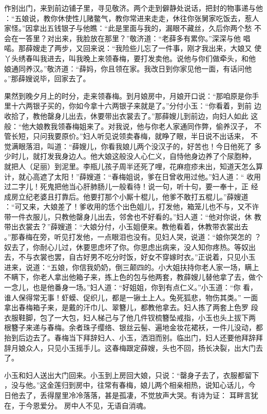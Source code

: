 作别出门，来到前边铺子里，寻见敬济。两个走到僻静处说话，把封的物事递与他
：“五娘说，教你休使性儿赌鳖气，教你常进来走走，休往你张舅家吃饭去，惹人
家怪。”因拿出五钱银子与他瞧：“此是里面与我的，漏眼不藏丝，久后你两个愁
不会在一答里？对出来，我脸放在那里？”敬济道：“老薛多有累你。”深深与他
唱喏。那薛嫂走了两步，又回来说：“我险些儿忘了一件事，刚才我出来，大娘又
使丫头绣春叫我进去，叫我晚上来领春梅，要打发卖他。说他与你们做牵头，和他
娘通同养汉。”敬济道：“薛妈，你且领在家。我改日到你家见他一面，有话问他
。”那薛嫂说毕，回家去了。

果然到晚夕月上的时分，走来领春梅。到月娘房中，月娘开口说：“那咱原是你手
里十六两银子买的，你如今拿十六两银子来就是了。”分付小玉：“你看着，到前
边收拾了，教他罄身儿出去，休要带出衣裳去了。”那薛嫂儿到前边，向妇人如此
这般：“他大娘教我领春梅姐来了。对我说，他与你老人家通同作弊，偷养汉子，
不管长短，只问我要原价。”妇人听见说领卖春梅，就睁了眼，半日说不出话来，
不觉满眼落泪，叫道：“薛嫂儿，你看我娘儿两个没汉子的，好苦也！今日他死了
多少时儿，就打发我身边人。他大娘这般没人心仁义，自恃他身边养了个尿胞种，
就把人（足丽）到泥里。李瓶儿孩子周半还死了哩，花麻痘疹未出，知道天怎么算
计，就心高遮了太阳！”薛嫂道：“春梅姐说，爹在日曾收用过他。”妇人道：“
收用过二字儿！死鬼把他当心肝肺肠儿一般看待！说一句，听十句，要一奉十，正
经成房立纪老婆且打靠后。他要打那个小厮十棍儿，他爹不敢打五棍儿。”薛嫂道
：“可又来，大娘差了！爹收用的恁个出色姐儿，打发他，箱笼儿也不与，又不许
带一件衣服儿，只教他罄身儿出去，邻舍也不好看的。”妇人道：“他对你说，休
教带出衣裳去？”薛嫂道：“大娘分付，小玉姐便来。教他看着，休教带衣裳出去
。”那春梅在旁，听见打发他，一点眼泪也没有。见妇人哭，说道：“娘你哭怎的
？奴去了，你耐心儿过，休要思虑坏了你。你思虑出病来，没人知你疼热。等奴出
去，不与衣裳也罢，自古好男不吃分时饭，好女不穿嫁时衣。”正说着，只见小玉
进来，说道：“五娘，你信我奶奶，倒三颠四的。小大姐扶持你老人家一场，瞒上
不瞒下，你老人拿出他箱子来，拣上色的包与他两套，教薛嫂儿替他拿了去，做个
一念儿，也是他番身一场。”妇人道：“好姐姐，你到有点仁义。”小玉道：“你
看，谁人保得常无事！虾蟆、促织儿，都是一锹土上人。兔死狐悲，物伤其类。”
一面拿出春梅箱子来，是戴的汗巾儿、翠簪儿，都教他拿去。妇人拣了两套上色罗
段衣服鞋脚，包了一大包，妇人梯己与了他几件钗梳簪坠戒指，小玉也头上拔下两
根簪子来递与春梅。余者珠子缨络、银丝云髻、遍地金妆花裙袄，一件儿没动，都
抬到后边去了。春梅当下拜辞妇人、小玉，洒泪而别。临出门，妇人还要他拜辞拜
辞月娘众人，只见小玉摇手儿。这春梅跟定薛嫂，头也不回，扬长决裂，出大门去
了。

小玉和妇人送出大门回来。小玉到上房回大娘，只说：“罄身子去了，衣服都留下
，没与他。”这金莲归到房中，往常有春梅，娘儿两个相亲相热，说知心话儿，今
日他去了，丢得屋里冷冷落落，甚是孤凄，不觉放声大哭。有诗为证：
耳畔言犹在，于今恩爱分。
房中人不见，无语自消魂。